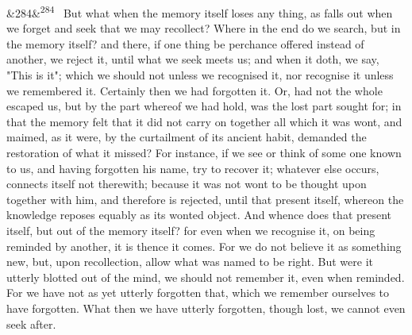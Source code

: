 \documentclass[12pt]{article}
\newcommand{\para}[1][]{\par\noindent\ifx&#1&\else\textsuperscript{\footnotesize #1}~\fi}
\begin{document}
\para[284] But what when the memory itself loses any thing, as falls out when we forget and seek that we may recollect? Where in the end do we search, but in the memory itself? and there, if one thing be perchance offered instead of another, we reject it, until what we seek meets us; and when it doth, we say, "This is it"; which we should not unless we recognised it, nor recognise it unless we remembered it. Certainly then we had forgotten it. Or, had not the whole escaped us, but by the part whereof we had hold, was the lost part sought for; in that the memory felt that it did not carry on together all which it was wont, and maimed, as it were, by the curtailment of its ancient habit, demanded the restoration of what it missed? For instance, if we see or think of some one known to us, and having forgotten his name, try to recover it; whatever else occurs, connects itself not therewith; because it was not wont to be thought upon together with him, and therefore is rejected, until that present itself, whereon the knowledge reposes equably as its wonted object. And whence does that present itself, but out of the memory itself? for even when we recognise it, on being reminded by another, it is thence it comes. For we do not believe it as something new, but, upon recollection, allow what was named to be right. But were it utterly blotted out of the mind, we should not remember it, even when reminded. For we have not as yet utterly forgotten that, which we remember ourselves to have forgotten. What then we have utterly forgotten, though lost, we cannot even seek after.
\end{document}
